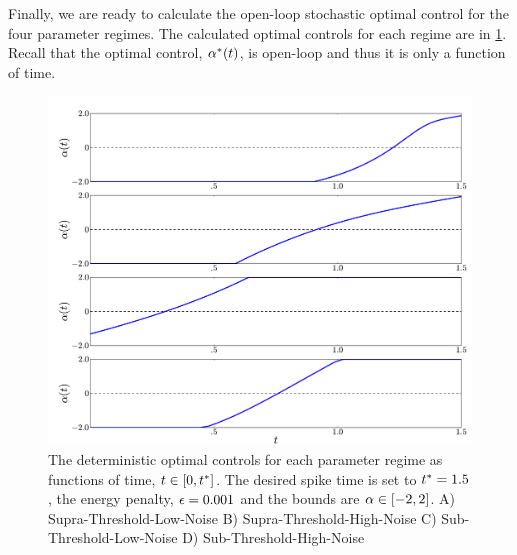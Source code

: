 \documentclass[12pt]{iopart}
\begin{document}
Finally, we are ready to calculate the open-loop stochastic optimal control for
the four parameter regimes. The calculated optimal controls for each regime are
in \cref{fig:FBK_Regimes_cs}. Recall that the optimal control, ${\alpha}^*(t)$, is
open-loop and thus it is only a function of time.
\begin{figure}[htp]
\begin{center}
  \includegraphics[width=.99\textwidth]{Figs/FP_Adjoint/Regimes_cs.pdf}
  \caption[labelInTOC]{The deterministic optimal controls for each parameter
  regime as functions of time, $t \in [0, { t^* }]$.
  The desired spike time is set to ${ t^* }=1.5$, the energy penalty, ${\epsilon}
  = 0.001$ and the bounds are ${\alpha} \in [-2,2]$.
  A) Supra-Threshold-Low-Noise B) Supra-Threshold-High-Noise
C) Sub-Threshold-Low-Noise   D) Sub-Threshold-High-Noise  }
  \label{fig:FBK_Regimes_cs}
\end{center}
\end{figure}
\end{document}
